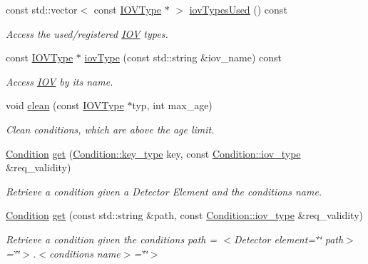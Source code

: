 \begin{DoxyCompactItemize}
const std\+::vector$<$ const \hyperlink{class_d_d4hep_1_1_i_o_v_type}{I\+O\+V\+Type} $\ast$ $>$ \hyperlink{class_d_d4hep_1_1_conditions_1_1_conditions_access_a8d22f883fc827ab82631a0a00bcc2c88}{iov\+Types\+Used} () const
\begin{DoxyCompactList}\small\item\em Access the used/registered \hyperlink{class_d_d4hep_1_1_i_o_v}{I\+OV} types. \end{DoxyCompactList}\item 
const \hyperlink{class_d_d4hep_1_1_i_o_v_type}{I\+O\+V\+Type} $\ast$ \hyperlink{class_d_d4hep_1_1_conditions_1_1_conditions_access_a47adb812dd047300b7b69b6544007397}{iov\+Type} (const std\+::string \&iov\+\_\+name) const
\begin{DoxyCompactList}\small\item\em Access \hyperlink{class_d_d4hep_1_1_i_o_v}{I\+OV} by its name. \end{DoxyCompactList}\item 
void \hyperlink{class_d_d4hep_1_1_conditions_1_1_conditions_access_af8320af218167cfc28bf10763cc64f94}{clean} (const \hyperlink{class_d_d4hep_1_1_i_o_v_type}{I\+O\+V\+Type} $\ast$typ, int max\+\_\+age)
\begin{DoxyCompactList}\small\item\em Clean conditions, which are above the age limit. \end{DoxyCompactList}\item 
\hyperlink{class_d_d4hep_1_1_conditions_1_1_condition}{Condition} \hyperlink{class_d_d4hep_1_1_conditions_1_1_conditions_access_a9adb922d63cdbb66043c5aaf90fe0a20}{get} (\hyperlink{class_d_d4hep_1_1_conditions_1_1_condition_a7528efa762e8cc072ef80ea67c3531f9}{Condition\+::key\+\_\+type} key, const \hyperlink{class_d_d4hep_1_1_conditions_1_1_condition_ad84300e226b2085ec5e9db7f47be5539}{Condition\+::iov\+\_\+type} \&req\+\_\+validity)
\begin{DoxyCompactList}\small\item\em Retrieve a condition given a Detector Element and the conditions name. \end{DoxyCompactList}\item 
\hyperlink{class_d_d4hep_1_1_conditions_1_1_condition}{Condition} \hyperlink{class_d_d4hep_1_1_conditions_1_1_conditions_access_abadda777e6c3ef97bd6675fdceda2630}{get} (const std\+::string \&path, const \hyperlink{class_d_d4hep_1_1_conditions_1_1_condition_ad84300e226b2085ec5e9db7f47be5539}{Condition\+::iov\+\_\+type} \&req\+\_\+validity)
\begin{DoxyCompactList}\small\item\em Retrieve a condition given the conditions path = $<$\+Detector element=\char`\"{}\char`\"{} path$>$=\char`\"{}\char`\"{}$>$.$<$conditions name$>$=\char`\"{}\char`\"{}$>$ \end{DoxyCompactList}\item 

\end{DoxyCompactItemize}
